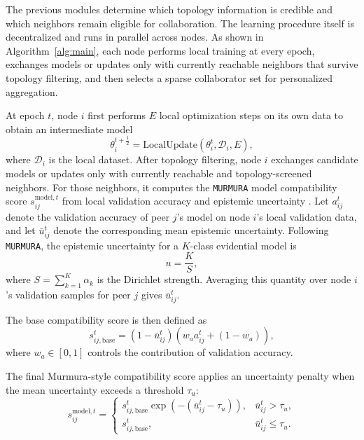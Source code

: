 \documentclass[journal]{IEEEtran}
\theoremstyle{definition}
\theoremstyle{remark}
\begin{document}
The previous modules determine which topology information is credible and which neighbors remain eligible for collaboration. The learning procedure itself is decentralized and runs in parallel across nodes. As shown in Algorithm~\ref{alg:main}, each node performs local training at every epoch, exchanges models or updates only with currently reachable neighbors that survive topology filtering, and then selects a sparse collaborator set for personalized aggregation.

At epoch $t$, node $i$ first performs $E$ local optimization steps on its own data to obtain an intermediate model
\begin{equation}
\theta_i^{t+\frac{1}{2}} = \mathrm{LocalUpdate}(\theta_i^t,\mathcal{D}_i,E),
\end{equation}
where $\mathcal{D}_i$ is the local dataset. After topology filtering, node $i$ exchanges candidate models or updates only with currently reachable and topology-screened neighbors. For those neighbors, it computes the \texttt{MURMURA} model compatibility score $s_{ij}^{\text{model},t}$ from local validation accuracy and epistemic uncertainty \cite{rangwala2025evidential}. Let $a_{ij}^t$ denote the validation accuracy of peer $j$'s model on node $i$'s local validation data, and let $\bar{u}_{ij}^t$ denote the corresponding mean epistemic uncertainty. Following \texttt{MURMURA}, the epistemic uncertainty for a $K$-class evidential model is
\begin{equation}
u = \frac{K}{S},
\end{equation}
where $S=\sum_{k=1}^K \alpha_k$ is the Dirichlet strength. Averaging this quantity over node $i$'s validation samples for peer $j$ gives $\bar{u}_{ij}^t$.

The base compatibility score is then defined as
\begin{equation}
s_{ij,\text{base}}^t
=
\left(1-\bar{u}_{ij}^t\right)
\left(w_a a_{ij}^t + (1-w_a)\right),
\end{equation}
where $w_a \in [0,1]$ controls the contribution of validation accuracy.

The final Murmura-style compatibility score applies an uncertainty penalty when the mean uncertainty exceeds a threshold $\tau_u$:
\begin{equation}
s_{ij}^{\text{model},t}
=
\begin{cases}
s_{ij,\text{base}}^t \exp\!\left(-(\bar{u}_{ij}^t-\tau_u)\right), & \bar{u}_{ij}^t > \tau_u, \\[4pt]
s_{ij,\text{base}}^t, & \bar{u}_{ij}^t \le \tau_u.
\end{cases}
\end{equation}
\end{document}
